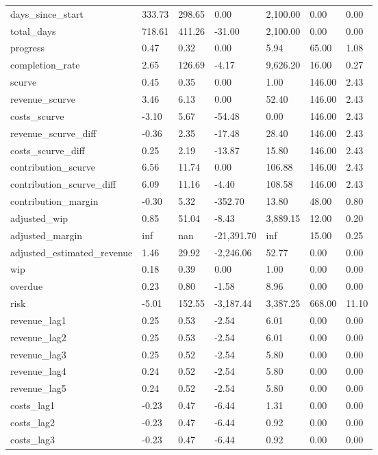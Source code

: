 \begin{landscape}
\begin{longtable}[h!]{lllllll}
days_since_start & 333.73 & 298.65 & 0.00 & 2,100.00 & 0.00 & 0.00 \\
total_days & 718.61 & 411.26 & -31.00 & 2,100.00 & 0.00 & 0.00 \\
progress & 0.47 & 0.32 & 0.00 & 5.94 & 65.00 & 1.08 \\
completion_rate & 2.65 & 126.69 & -4.17 & 9,626.20 & 16.00 & 0.27 \\
scurve & 0.45 & 0.35 & 0.00 & 1.00 & 146.00 & 2.43 \\
revenue_scurve & 3.46 & 6.13 & 0.00 & 52.40 & 146.00 & 2.43 \\
costs_scurve & -3.10 & 5.67 & -54.48 & 0.00 & 146.00 & 2.43 \\
revenue_scurve_diff & -0.36 & 2.35 & -17.48 & 28.40 & 146.00 & 2.43 \\
costs_scurve_diff & 0.25 & 2.19 & -13.87 & 15.80 & 146.00 & 2.43 \\
contribution_scurve & 6.56 & 11.74 & 0.00 & 106.88 & 146.00 & 2.43 \\
contribution_scurve_diff & 6.09 & 11.16 & -4.40 & 108.58 & 146.00 & 2.43 \\
contribution_margin & -0.30 & 5.32 & -352.70 & 13.80 & 48.00 & 0.80 \\
adjusted_wip & 0.85 & 51.04 & -8.43 & 3,889.15 & 12.00 & 0.20 \\
adjusted_margin & inf & nan & -21,391.70 & inf & 15.00 & 0.25 \\
adjusted_estimated_revenue & 1.46 & 29.92 & -2,246.06 & 52.77 & 0.00 & 0.00 \\
wip & 0.18 & 0.39 & 0.00 & 1.00 & 0.00 & 0.00 \\
overdue & 0.23 & 0.80 & -1.58 & 8.96 & 0.00 & 0.00 \\
risk & -5.01 & 152.55 & -3,187.44 & 3,387.25 & 668.00 & 11.10 \\
revenue_lag1 & 0.25 & 0.53 & -2.54 & 6.01 & 0.00 & 0.00 \\
revenue_lag2 & 0.25 & 0.53 & -2.54 & 6.01 & 0.00 & 0.00 \\
revenue_lag3 & 0.25 & 0.52 & -2.54 & 5.80 & 0.00 & 0.00 \\
revenue_lag4 & 0.24 & 0.52 & -2.54 & 5.80 & 0.00 & 0.00 \\
revenue_lag5 & 0.24 & 0.52 & -2.54 & 5.80 & 0.00 & 0.00 \\
costs_lag1 & -0.23 & 0.47 & -6.44 & 1.31 & 0.00 & 0.00 \\
costs_lag2 & -0.23 & 0.47 & -6.44 & 0.92 & 0.00 & 0.00 \\
costs_lag3 & -0.23 & 0.47 & -6.44 & 0.92 & 0.00 & 0.00 \\

\end{longtable}
\end{landscape}
